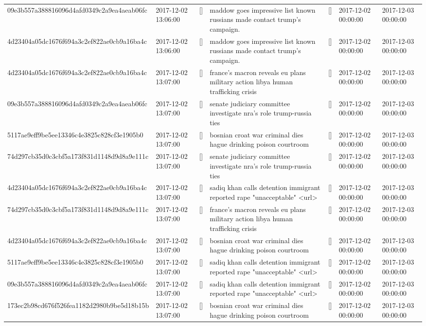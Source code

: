 \begin{tabular}{lllllll}
09e3b557a388816096d4afd0349c2a9ea4aeab06fc & 2017-12-02 13:06:00 & [] & maddow goes impressive list known russians made contact trump's campaign. & [] & 2017-12-02 00:00:00 & 2017-12-03 00:00:00 \\
4d23404a05dc1676f694a3c2ef822ae0cb9a16ba4c & 2017-12-02 13:06:00 & [] & maddow goes impressive list known russians made contact trump's campaign. & [] & 2017-12-02 00:00:00 & 2017-12-03 00:00:00 \\
4d23404a05dc1676f694a3c2ef822ae0cb9a16ba4c & 2017-12-02 13:07:00 & [] & france's macron reveals eu plans military action libya human trafficking crisis & [] & 2017-12-02 00:00:00 & 2017-12-03 00:00:00 \\
09e3b557a388816096d4afd0349c2a9ea4aeab06fc & 2017-12-02 13:07:00 & [] & senate judiciary committee investigate nra's role trump-russia ties & [] & 2017-12-02 00:00:00 & 2017-12-03 00:00:00 \\
5117ae9eff9be5ee13346c4e3825c828cf3e1905b0 & 2017-12-02 13:07:00 & [] & bosnian croat war criminal dies hague drinking poison courtroom & [] & 2017-12-02 00:00:00 & 2017-12-03 00:00:00 \\
74d297cb35d0c3cbf5a173f831d1148d9d8a9e111c & 2017-12-02 13:07:00 & [] & senate judiciary committee investigate nra's role trump-russia ties & [] & 2017-12-02 00:00:00 & 2017-12-03 00:00:00 \\
4d23404a05dc1676f694a3c2ef822ae0cb9a16ba4c & 2017-12-02 13:07:00 & [] & sadiq khan calls detention immigrant reported rape "unacceptable" <url> & [] & 2017-12-02 00:00:00 & 2017-12-03 00:00:00 \\
74d297cb35d0c3cbf5a173f831d1148d9d8a9e111c & 2017-12-02 13:07:00 & [] & france's macron reveals eu plans military action libya human trafficking crisis & [] & 2017-12-02 00:00:00 & 2017-12-03 00:00:00 \\
4d23404a05dc1676f694a3c2ef822ae0cb9a16ba4c & 2017-12-02 13:07:00 & [] & bosnian croat war criminal dies hague drinking poison courtroom & [] & 2017-12-02 00:00:00 & 2017-12-03 00:00:00 \\
5117ae9eff9be5ee13346c4e3825c828cf3e1905b0 & 2017-12-02 13:07:00 & [] & sadiq khan calls detention immigrant reported rape "unacceptable" <url> & [] & 2017-12-02 00:00:00 & 2017-12-03 00:00:00 \\
09e3b557a388816096d4afd0349c2a9ea4aeab06fc & 2017-12-02 13:07:00 & [] & sadiq khan calls detention immigrant reported rape "unacceptable" <url> & [] & 2017-12-02 00:00:00 & 2017-12-03 00:00:00 \\
173ec2b98cd676f526fea1182d2980b9be5d18b15b & 2017-12-02 13:07:00 & [] & bosnian croat war criminal dies hague drinking poison courtroom & [] & 2017-12-02 00:00:00 & 2017-12-03 00:00:00 \\

\end{tabular}
